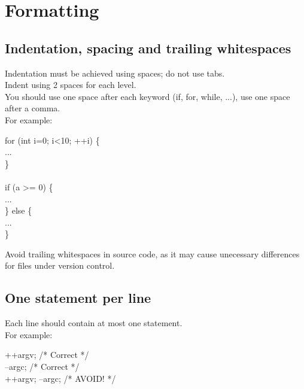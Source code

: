 \section{Formatting}

\subsection{Indentation, spacing and trailing whitespaces}
Indentation must be achieved using spaces; do not use tabs.\\
Indent using 2 spaces for each level.\\

You should use one space after each keyword (if, for, while, ...), use
one space after a comma.\\

For example:
\begin{algorithm}[H]
for (int i=0; i<10; ++i) \{ \\
... \\
\} \\
 \\
if (a >= 0) \{ \\
... \\
\} else \{ \\
... \\
\}
\end{algorithm}

Avoid trailing whitespaces in source code, as it may cause unecessary
differences for files under version control.

\subsection{One statement per line}
Each line should contain at most one statement.\\

For example:
\begin{algorithm}[H]
++argv;                /* Correct */ \\
--argc;                /* Correct */ \\
++argv; --argc;        /* AVOID! */
\end{algorithm}

